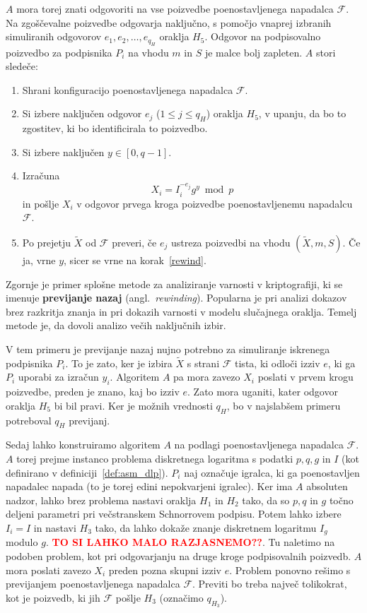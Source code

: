 \documentclass[isrm2, tisk]{fmfdelo}
\newcommand{\todo}[1]{\textcolor{red}{\textbf{\uppercase{#1}??}}}
\begin{document}
$A$ mora torej znati odgovoriti na vse poizvedbe poenostavljenega napadalca $\mathcal{F}$. Na zgoščevalne 
poizvedbe odgovarja naključno, s pomočjo vnaprej izbranih simuliranih odgovorov $e_1, e_2, \dots, 
e_{q_H}$ oraklja $H_5$. Odgovor na podpisovalno poizvedbo za podpisnika $P_i$ na vhodu $m$ in $S$
je malce bolj zapleten. $A$ stori sledeče:
\begin{enumerate}
    \item Shrani konfiguracijo poenostavljenega napadalca $\mathcal{F}$.
    \item \label{rewind} Si izbere naključen odgovor $e_j$ ($1 \le j \le q_H$) oraklja $H_5$, v upanju, da bo to
        zgostitev, ki bo identificirala to poizvedbo.
    \item Si izbere naključen $y \in [0, q - 1]$.
    \item Izračuna 
        $$
        X_i = I_i^{-e_j}g^y \bmod p
        $$
        in pošlje $X_i$ v odgovor prvega kroga poizvedbe poenostavljenemu napadalcu $\mathcal{F}$.
    \item Po prejetju $\tilde{X}$ od $\mathcal{F}$ preveri, če $e_j$ ustreza poizvedbi na vhodu
        $(\tilde{X}, m, S)$. Če ja, vrne $y$, sicer se vrne na korak~\ref{rewind}.
\end{enumerate}
Zgornje je primer splošne metode za analiziranje varnosti v kriptografiji, ki se imenuje 
\textbf{previjanje nazaj} (angl.\ \textit{rewinding}). Popularna je pri analizi dokazov brez razkritja
znanja in pri dokazih varnosti v modelu slučajnega oraklja. Temelj metode je, da dovoli analizo večih
naključnih izbir.

V tem primeru je previjanje nazaj nujno potrebno za simuliranje iskrenega podpisnika $P_i$. To je zato,
ker je izbira $\tilde{X}$ s strani $\mathcal{F}$ tista, ki odloči izziv $e$, ki ga $P_i$ uporabi za
izračun $y_i$. Algoritem $A$ pa mora zavezo $X_i$ poslati v prvem krogu poizvedbe, preden je znano,
kaj bo izziv $e$. Zato mora uganiti, kater odgovor oraklja $H_5$ bi bil pravi. Ker je možnih vrednosti
$q_H$, bo v najslabšem primeru potreboval $q_H$ previjanj.

Sedaj lahko konstruiramo algoritem $A$ na podlagi poenostavljenega napadalca $\mathcal{F}$. $A$ torej
prejme instanco problema diskretnega logaritma s podatki $p, q, g$ in $I$ (kot definirano v 
definiciji~\ref{def:asm_dlp}). $P_i$ naj označuje igralca, ki ga poenostavljen napadalec napada
(to je torej edini nepokvarjeni igralec). Ker ima $A$ absoluten nadzor, lahko brez problema
nastavi oraklja $H_1$ in $H_2$ tako, da so $p, q$ in $g$ točno deljeni parametri pri večstranskem
Schnorrovem podpisu. Potem lahko izbere $I_i = I$ in nastavi $H_3$ tako, da lahko dokaže znanje
diskretnem logaritmu $I_g$ modulo $g$. \todo{to si lahko malo razjasnemo}. Tu naletimo na podoben
problem, kot pri odgovarjanju na druge kroge podpisovalnih poizvedb. $A$ mora poslati zavezo $X_i$
preden pozna skupni izziv $e$. Problem ponovno rešimo s previjanjem poenostavljenega napadalca
$\mathcal{F}$. Previti bo treba največ tolikokrat, kot je poizvedb, ki jih $\mathcal{F}$ pošlje
$H_3$ (označimo $q_{H_3}$).
\end{document}
